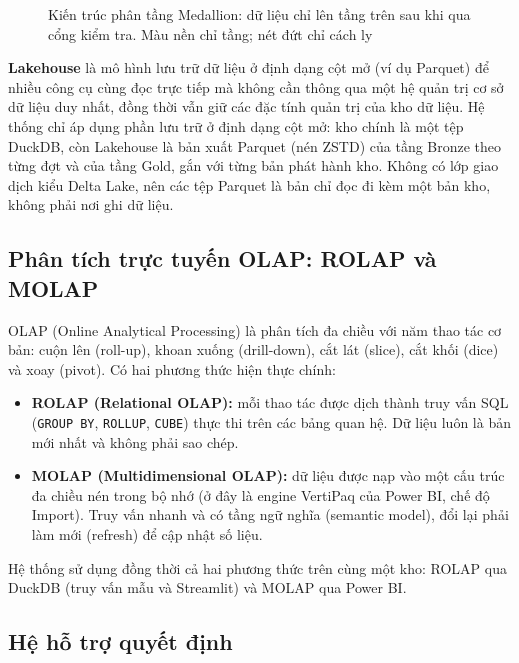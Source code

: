 \begin{figure}[htbp]
\centering
\resizebox{\textwidth}{!}{}
\caption{Kiến trúc phân tầng Medallion: dữ liệu chỉ lên tầng trên sau khi qua cổng kiểm tra. Màu nền chỉ tầng; nét đứt chỉ cách ly}
\label{fig:medallion_theory}
\end{figure}

\textbf{Lakehouse} \cite{armbrust2021} là mô hình lưu trữ dữ liệu ở định dạng cột mở (ví dụ Parquet) để nhiều công cụ cùng đọc trực tiếp mà không cần thông qua một hệ quản trị cơ sở dữ liệu duy nhất, đồng thời vẫn giữ các đặc tính quản trị của kho dữ liệu. Hệ thống chỉ áp dụng phần lưu trữ ở định dạng cột mở: kho chính là một tệp DuckDB, còn Lakehouse là bản xuất Parquet (nén ZSTD) của tầng Bronze theo từng đợt và của tầng Gold, gắn với từng bản phát hành kho. Không có lớp giao dịch kiểu Delta Lake, nên các tệp Parquet là bản chỉ đọc đi kèm một bản kho, không phải nơi ghi dữ liệu.

\subsection{Phân tích trực tuyến OLAP: ROLAP và MOLAP}
OLAP (Online Analytical Processing) là phân tích đa chiều với năm thao tác cơ bản: cuộn lên (roll-up), khoan xuống (drill-down), cắt lát (slice), cắt khối (dice) và xoay (pivot). Có hai phương thức hiện thực chính:
\begin{itemize}
    \item \textbf{ROLAP (Relational OLAP):} mỗi thao tác được dịch thành truy vấn SQL (\texttt{GROUP BY}, \texttt{ROLLUP}, \texttt{CUBE}) thực thi trên các bảng quan hệ. Dữ liệu luôn là bản mới nhất và không phải sao chép.
    \item \textbf{MOLAP (Multidimensional OLAP):} dữ liệu được nạp vào một cấu trúc đa chiều nén trong bộ nhớ (ở đây là engine VertiPaq của Power BI, chế độ Import). Truy vấn nhanh và có tầng ngữ nghĩa (semantic model), đổi lại phải làm mới (refresh) để cập nhật số liệu.
\end{itemize}
Hệ thống sử dụng đồng thời cả hai phương thức trên cùng một kho: ROLAP qua DuckDB (truy vấn mẫu và Streamlit) và MOLAP qua Power BI.

\subsection{Hệ hỗ trợ quyết định}
